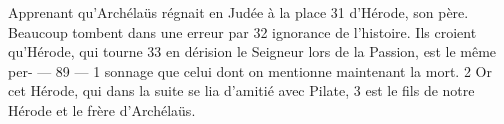 Apprenant qu'Archélaüs régnait en Judée à la place	 
31	 	d'Hérode, son père. Beaucoup tombent dans une erreur par	 
32	 	ignorance de l'histoire. Ils croient qu'Hérode, qui tourne	 
33	 	en dérision le Seigneur lors de la Passion, est le même per-	 
 	--- 89 ---	 
1	 	sonnage que celui dont on mentionne maintenant la mort.	 
2	 	Or cet Hérode, qui dans la suite se lia d'amitié avec Pilate,	 
3	 	est le fils de notre Hérode et le frère d'Archélaüs.